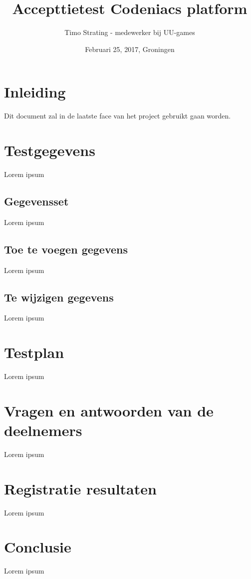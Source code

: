 \documentclass[]{report}
\title{Accepttietest Codeniacs platform}
\author{Timo Strating - medewerker bij UU-games}
\date{Februari 25, 2017, Groningen}
\begin{document}
\maketitle

\tableofcontents
\newpage






\chapter{Inleiding}

Dit document zal in de laatste face van het project gebruikt gaan worden.





\chapter{Testgegevens}

Lorem ipsum

\section{Gegevensset}
Lorem ipsum

\section{Toe te voegen gegevens}
Lorem ipsum

\section{Te wijzigen gegevens}
Lorem ipsum





\chapter{Testplan}

Lorem ipsum





\chapter{Vragen en antwoorden van de deelnemers}

Lorem ipsum





\chapter{Registratie resultaten}

Lorem ipsum





\chapter{Conclusie}

Lorem ipsum
\end{document}
